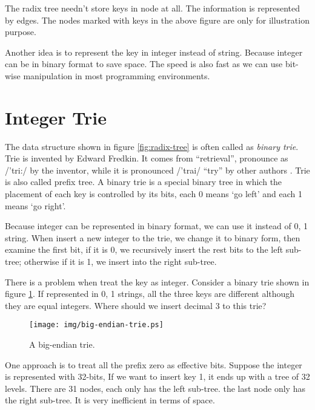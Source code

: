 \documentclass{article}
\begin{document}
The radix tree needn't store keys in node at all. The
information is represented by edges. The nodes marked with keys
in the above figure are only for illustration purpose.

Another idea is to represent the key in integer instead of string.
Because integer can be in binary format to save space. The speed
is also fast as we can use bit-wise manipulation in
most programming environments.

\section{Integer Trie}
\label{int-trie}

The data structure shown in figure \ref{fig:radix-tree} is
often called as \emph{binary trie}.
Trie is invented by Edward Fredkin. It comes from ``retrieval'', pronounce
as /'tri:/ by the inventor, while it is pronounced /'trai/ ``try''
by other authors \cite{wiki-trie}. Trie is also called prefix tree.
A binary
trie is a special binary tree in which the placement of each key is controlled by
its bits, each 0 means `go left' and each 1 means `go
right'\cite{okasaki-int-map}.

Because integer can be represented in binary format, we can use it
instead of 0, 1 string. When insert a new integer to the trie, we
change it to binary form, then examine
the first bit, if it is 0, we recursively
insert the rest bits to the left sub-tree; otherwise if it is 1, we insert
into the right sub-tree.

There is a problem when treat the key as integer. Consider a binary
trie shown in figure \ref{fig:big-endian-trie}. If represented in
0, 1 strings, all the three keys are different although they are equal integers.
Where should we insert decimal 3 to this trie?

\begin{figure}[htbp]
  \centering
  \texttt{[image: img/big-endian-trie.ps]}
  \caption{A big-endian trie.} \label{fig:big-endian-trie}
\end{figure}

One approach is to treat all the prefix zero as effective bits.
Suppose the integer is represented with 32-bits, If we want to insert key 1,
it ends up with a tree of 32 levels.
There are 31 nodes, each only has the left sub-tree. the last node only has
the right sub-tree. It is very inefficient in terms of space.
\end{document}
